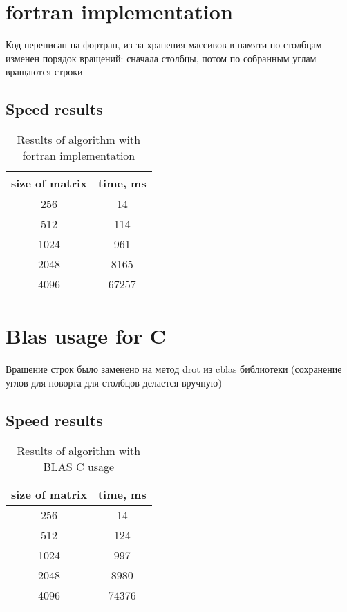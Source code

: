 \documentclass[12pt]{report}
\begin{document}
	\chapter{fortran implementation}
	Код переписан на фортран, из-за хранения массивов в памяти по столбцам изменен порядок вращений: сначала столбцы, потом
	по собранным углам вращаются строки

	\section{Speed results}
	\begin{table}[h!]
		\centering
		\begin{tabular}{ | c | c | }
			\hline
			size of matrix & time, ms\\  [0.5ex]
			\hline\hline
			256 & 14 \\
			\hline
			512 & 114 \\
			\hline
			1024 & 961 \\
			\hline
			2048 & 8165 \\
			\hline
			4096 & 67257 \\
			\hline
		\end{tabular}
		\caption{Results of algorithm with fortran implementation}
	\end{table}

	\chapter{Blas usage for C}
	Вращение строк было заменено на метод drot из cblas библиотеки (сохранение углов для поворта для столбцов делается вручную)

	\section{Speed results}
	\begin{table}[h!]
		\centering
		\begin{tabular}{ | c | c | }
			\hline
			size of matrix & time, ms\\  [0.5ex]
			\hline\hline
			256 & 14 \\
			\hline
			512 & 124 \\
			\hline
			1024 & 997 \\
			\hline
			2048 & 8980 \\
			\hline
			4096 & 74376 \\
			\hline
		\end{tabular}
		\caption{Results of algorithm with BLAS C usage}
	\end{table}
\end{document}
